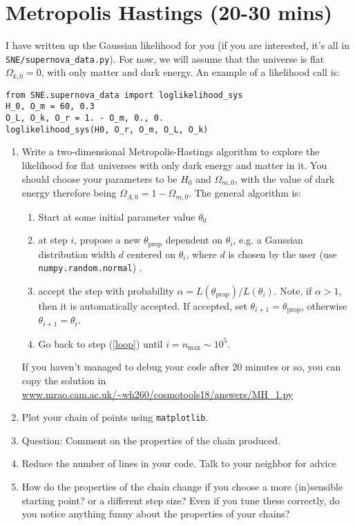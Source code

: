 \documentclass{article}
\begin{document}
\section{Metropolis Hastings (20-30 mins)}
I have written up the Gaussian likelihood for you (if you are interested, it's all in \texttt{SNE/supernova_data.py}). For now, we will assume that the universe is flat $\Omega_{k,0} = 0$, with only matter and dark energy. An example of a likelihood call is:
\begin{verbatim}
from SNE.supernova_data import loglikelihood_sys
H_0, O_m = 60, 0.3
O_L, O_k, O_r = 1. - O_m, 0., 0.
loglikelihood_sys(H0, O_r, O_m, O_L, O_k)
\end{verbatim}
\begin{enumerate}[resume]
    \item Write a two-dimensional Metropolis-Hastings algorithm to explore the likelihood for flat universes with only dark energy and matter in it. You should choose your parameters to be $H_0$ and $\Omega_{m,0}$, with the value of dark energy therefore being $\Omega_{\Lambda,0} = 1-\Omega_{m,0}$. The general algorithm is:
    \begin{enumerate}
        \item Start at some initial parameter value $\theta_0$
        \item at step $i$, propose a new $\theta_\text{prop}$ dependent on $\theta_{i}$, e.g. a Gaussian distribution width $d$ centered on $\theta_{i}$, where $d$ is chosen by the user (use \texttt{numpy.random.normal}) \label{loop}.
        \item accept the step with probability $\alpha = L(\theta_\text{prop})/L(\theta_i)$. Note, if $\alpha>1$, then it is automatically accepted. If accepted, set $\theta_{i+1}=\theta_\text{prop}$, otherwise $\theta_{i+1}=\theta_i$.
        \item Go back to step (\ref{loop}) until $i=n_\text{max}\sim 10^5$.
    \end{enumerate}
    If you haven't managed to debug your code after 20 minutes or so, you can copy the solution in \url{www.mrao.cam.ac.uk/~wh260/cosmotools18/answers/MH_1.py}
\item Plot your chain of points using \texttt{matplotlib}.
\item Question: Comment on the properties of the chain produced.
\item Reduce the number of lines in your code. Talk to your neighbor for advice
\item How do the properties of the chain change if you choose a more (in)sensible starting point? or a different step size? Even if you tune these correctly, do you notice anything funny about the properties of your chains?

\end{enumerate}
\end{document}
